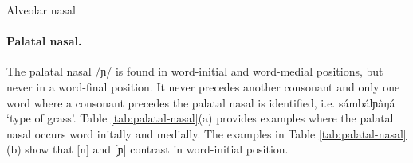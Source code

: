 \begin{table}[htb] \small
\centering
\caption{Alveolar nasal\label{tab:alveolar-nasal}}
\quad
{}

\end{table}

\paragraph{Palatal nasal.}

The palatal nasal /{\sls ɲ}/ is found in word-initial  and word-medial 
positions, but never in  a word-final position. It never precedes another 
consonant and only one word where a consonant precedes the palatal nasal is 
identified, i.e. {\sls sámbálɲàŋá} `type of grass'.  Table  
\ref{tab:palatal-nasal}(a) provides examples where the palatal nasal occurs word 
initally and medially. The examples in Table \ref{tab:palatal-nasal}(b)  show 
that [n] and [ɲ] contrast in word-initial position.  



